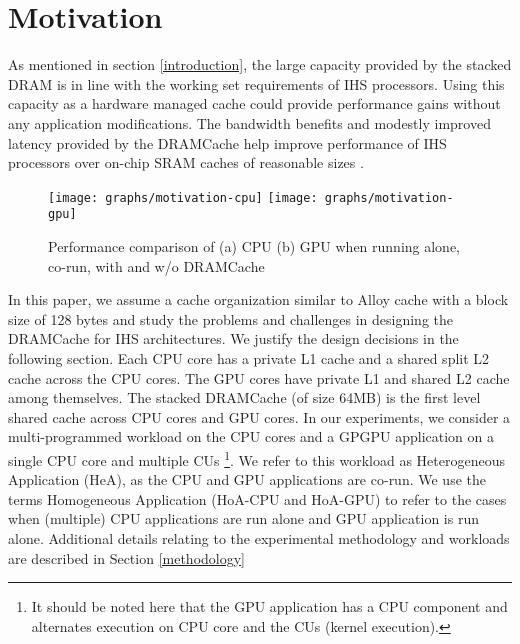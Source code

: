 \section{Motivation} \label{motivation}
As mentioned in section \ref{introduction}, the large capacity provided by the stacked DRAM is in line with the working set requirements of IHS processors. Using this capacity as a hardware managed cache could provide performance gains without any application modifications. The bandwidth benefits and modestly improved latency provided by the DRAMCache help improve performance of IHS processors over on-chip SRAM caches of reasonable sizes \cite{amd-exascale1}. 
\begin{figure}[htbp]
   \centering
   \texttt{[image: graphs/motivation-cpu]}
   \texttt{[image: graphs/motivation-gpu]}
   \caption{Performance comparison of (a) CPU (b) GPU when running alone, co-run, with and w/o DRAMCache}
   \label{fig:motivation}
\end{figure}
\par In this paper, we assume a cache organization similar to Alloy cache \cite{alloy} with a block size of 128 bytes and study the problems and challenges in designing the DRAMCache for IHS architectures. We justify the design decisions in the following section. 
Each CPU core has a private L1 cache and a shared split L2 cache across the CPU cores. The GPU cores have private L1 and shared L2 cache among themselves.  
The stacked DRAMCache (of size 64MB) is the first level shared cache across CPU cores and GPU cores. In our experiments, we consider a multi-programmed workload on the CPU cores and a GPGPU application on a single CPU core and multiple CUs 
\footnote{It should be noted here that the GPU application has a CPU component and alternates execution on CPU core and the CUs (kernel execution).}. 
We refer to this workload as Heterogeneous Application (HeA), as the CPU and GPU applications are co-run. We use the terms Homogeneous Application (HoA-CPU and HoA-GPU) to refer to the cases when (multiple) CPU applications are run alone and GPU application is run alone. 
Additional details relating to the experimental methodology and workloads are described in Section \ref{methodology}


